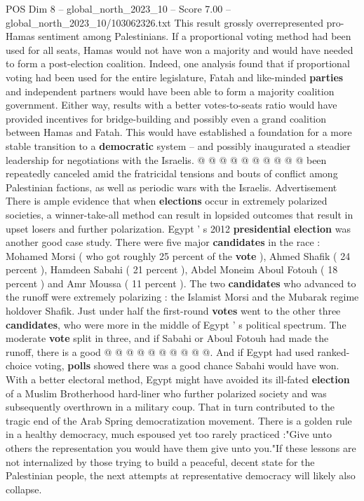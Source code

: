 \begin{textsample}{POS Dim 8 – global\_north\_2023\_10 – Score 7.00 – global\_north\_2023\_10/103062326.txt}
This result grossly overrepresented pro-Hamas sentiment among Palestinians.
If a proportional voting method had been used for all seats, Hamas would not have won a majority and would have needed to form a post-election coalition.
Indeed, one analysis found that if proportional voting had been used for the entire legislature, Fatah and like-minded \textbf{parties} and independent partners would have been able to form a majority coalition government.
Either way, results with a better votes-to-seats ratio would have provided incentives for bridge-building and possibly even a grand coalition between Hamas and Fatah.
This would have established a foundation for a more stable transition to a \textbf{democratic} system -- and possibly inaugurated a steadier leadership for negotiations with the Israelis. @ @ @ @ @ @ @ @ @ @ been repeatedly canceled amid the fratricidal tensions and bouts of conflict among Palestinian factions, as well as periodic wars with the Israelis.
Advertisement There is ample evidence that when \textbf{elections} occur in extremely polarized societies, a winner-take-all method can result in lopsided outcomes that result in upset losers and further polarization.
Egypt ' s 2012 \textbf{presidential} \textbf{election} was another good case study.
There were five major \textbf{candidates} in the race : Mohamed Morsi ( who got roughly 25 percent of the \textbf{vote} ), Ahmed Shafik ( 24 percent ), Hamdeen Sabahi ( 21 percent ), Abdel Moneim Aboul Fotouh ( 18 percent ) and Amr Moussa ( 11 percent ).
The two \textbf{candidates} who advanced to the runoff were extremely polarizing : the Islamist Morsi and the Mubarak regime holdover Shafik.
Just under half the first-round \textbf{votes} went to the other three \textbf{candidates}, who were more in the middle of Egypt ' s political spectrum.
The moderate \textbf{vote} split in three, and if Sabahi or Aboul Fotouh had made the runoff, there is a good @ @ @ @ @ @ @ @ @ @.
And if Egypt had used ranked-choice voting, \textbf{polls} showed there was a good chance Sabahi would have won.
With a better electoral method, Egypt might have avoided its ill-fated \textbf{election} of a Muslim Brotherhood hard-liner who further polarized society and was subsequently overthrown in a military coup.
That in turn contributed to the tragic end of the Arab Spring democratization movement.
There is a golden rule in a healthy democracy, much espoused yet too rarely practiced :"Give unto others the representation you would have them give unto you."If these lessons are not internalized by those trying to build a peaceful, decent state for the Palestinian people, the next attempts at representative democracy will likely also collapse.

\end{textsample}
